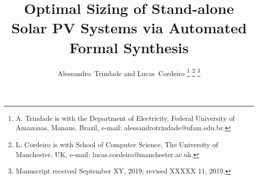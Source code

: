\documentclass[journal]{IEEEtran}
\begin{document}
%
\title{Optimal Sizing of Stand-alone Solar PV Systems via Automated Formal Synthesis}
%
%
%

\author{Alessandro~Trindade and Lucas~Cordeiro%
\thanks{A. Trindade is with the Department of Electricity, Federal University of Amazonas, Manaus, Brazil, e-mail: alessandrotrindade@ufam.edu.br.}%
\thanks{L. Cordeiro is with School of Computer Science, The University of Manchester, UK, e-mail: lucas.cordeiro@manchester.ac.uk.}%
\thanks{Manuscript received September XY, 2019; revised XXXXX 11, 2019.}}

% 
%
\end{document}
